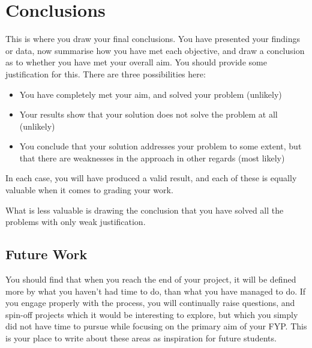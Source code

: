 %
%

\chapter{Conclusions}

This is where you draw your final conclusions. You have presented your findings
or data, now summarise how you have met each objective, and draw a conclusion
as to whether you have met your overall aim.  You should provide some
justification for this.  There are three possibilities here:

\begin{itemize}
  \item You have completely met your aim, and solved your problem (unlikely)
  \item Your results show that your solution does not solve the problem at all
    (unlikely)
  \item You conclude that your solution addresses your problem to some extent,
    but that there are weaknesses in the approach in other regards (most likely)
\end{itemize}

In each case, you will have produced a valid result, and each of these is
equally valuable when it comes to grading your work.

What is less valuable is drawing the conclusion that you have solved all the
problems with only weak justification.

\section{Future Work}

You should find that when you reach the end of your project, it will be defined
more by what you haven’t had time to do, than what you have managed to do.  If
you engage properly with the process, you will continually raise questions, and
spin-off projects which it would be interesting to explore, but which you
simply did not have time to pursue while focusing on the primary aim of your
FYP. This is your place to write about these areas as inspiration for future
students.
